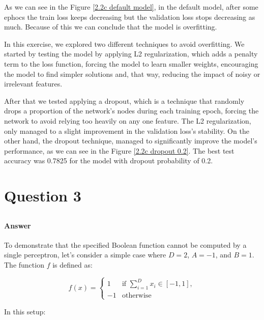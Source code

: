 \documentclass{article}
\begin{document}
As we can see in the Figure \ref{2.2c default model}, in the default model, after some ephocs the train loss keeps decreasing but the validation loss
stops decreasing as much. Because of this we can conclude that the model is overfitting.

In this exercise, we explored two different techniques to avoid overfitting. We started by testing the model by applying L2 regularization, which adds 
a penalty term to the loss function, forcing the model to learn smaller weights, encouraging the model to find simpler solutions and, that way, reducing 
the impact of noisy or irrelevant features. 

After that we tested applying a dropout, which is a technique that randomly drops a proportion of the network's nodes during each training epoch, 
forcing the network to avoid relying too heavily on any one feature. The L2 regularization, only managed to a slight improvement in the 
validation loss's stability. On the other hand, the dropout technique, managed to significantly improve the model's performance,
as we can see in the Figure \ref{2.2c dropout 0.2}. The best test accuracy was 0.7825 for the model with dropout probability of 0.2.

\section{Question 3}

\subsection{}
\subsubsection{}
\paragraph{Answer}

To demonstrate that the specified Boolean function cannot be computed by a single perceptron, let's consider a simple case where \( D = 2 \), \( A = -1 \), and \( B = 1 \). The function \( f \) is defined as:

\[
f(x) = 
\begin{cases} 
1 & \text{if } \sum_{i=1}^{D} x_i \in [-1, 1], \\
-1 & \text{otherwise}
\end{cases}
\]

In this setup:
\end{document}
